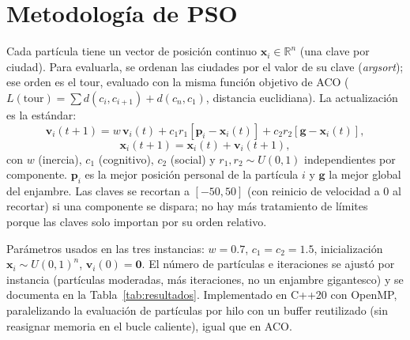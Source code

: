 \documentclass[12pt,a4paper]{article}
\begin{document}
\section{Metodología de PSO}
Cada partícula tiene un vector de posición continuo
$\mathbf{x}_i \in \mathbb{R}^n$ (una clave por ciudad). Para evaluarla,
se ordenan las ciudades por el valor de su clave (\emph{argsort}); ese
orden es el tour, evaluado con la misma función objetivo de ACO
($L(\text{tour}) = \sum d(c_i,c_{i+1}) + d(c_n,c_1)$, distancia
euclidiana). La actualización es la estándar:
\begin{equation}
\mathbf{v}_i(t{+}1) = w\,\mathbf{v}_i(t) + c_1 r_1 [\mathbf{p}_i - \mathbf{x}_i(t)] + c_2 r_2 [\mathbf{g} - \mathbf{x}_i(t)],
\label{eq:velocidad}
\end{equation}
\begin{equation}
\mathbf{x}_i(t{+}1) = \mathbf{x}_i(t) + \mathbf{v}_i(t{+}1),
\label{eq:posicion}
\end{equation}
con $w$ (inercia), $c_1$ (cognitivo), $c_2$ (social) y $r_1,r_2\sim U(0,1)$
independientes por componente. $\mathbf{p}_i$ es la mejor posición
personal de la partícula $i$ y $\mathbf{g}$ la mejor global del enjambre.
Las claves se recortan a $[-50,50]$ (con reinicio de velocidad a 0 al
recortar) si una componente se dispara; no hay más tratamiento de
límites porque las claves solo importan por su orden relativo.

Parámetros usados en las tres instancias: $w=0.7$, $c_1=c_2=1.5$,
inicialización $\mathbf{x}_i \sim U(0,1)^n$, $\mathbf{v}_i(0)=\mathbf{0}$.
El número de partículas e iteraciones se ajustó por instancia (partículas
moderadas, más iteraciones, no un enjambre gigantesco) y se documenta en
la Tabla~\ref{tab:resultados}. Implementado en C++20 con OpenMP,
paralelizando la evaluación de partículas por hilo con un buffer
reutilizado (sin reasignar memoria en el bucle caliente), igual que en
ACO.
\end{document}
